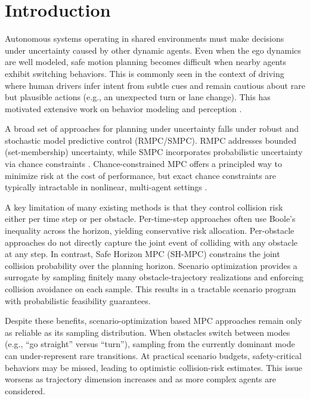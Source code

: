 \documentclass[letterpaper,10pt,conference]{ieeeconf}
\begin{document}

\section{Introduction}

Autonomous systems operating in shared environments must make decisions under uncertainty caused by other dynamic agents.
Even when the ego dynamics are well modeled, safe motion planning becomes difficult when nearby agents exhibit switching behaviors.
This is commonly seen in the context of driving where human drivers infer intent from subtle cues and remain cautious about rare but plausible actions (e.g., an unexpected turn or lane change). This has motivated extensive work on behavior modeling and perception \cite{Ha2013pedestrianBehavior,He1995socialForce,Zi2015youngOldCrossing,Hu2017bikeSocial,Hu2017bikeBehavior}.

A broad set of approaches for planning under uncertainty falls under robust and stochastic model predictive control (RMPC/SMPC).
RMPC addresses bounded (set-membership) uncertainty, while SMPC incorporates probabilistic uncertainty via chance constraints \cite{Mesbah2016SMPCOverview}.
Chance-constrained MPC offers a principled way to minimize risk at the cost of performance, but exact chance constraints are typically intractable in nonlinear, multi-agent settings \cite{Ch1959CCP,schwarm1999chance}.

A key limitation of many existing methods is that they control collision risk either per time step or per obstacle.
Per-time-step approaches often use Boole's inequality across the horizon, yielding conservative risk allocation.
Per-obstacle approaches do not directly capture the joint event of colliding with any obstacle at any step.
In contrast, Safe Horizon MPC (SH-MPC) \cite{degroot2023SBMotionBounded} constrains the joint collision probability over the planning horizon.
Scenario optimization \cite{Cal2006ScenarioApproach,Ca2018ScenarioTheory} provides a surrogate by sampling finitely many obstacle-trajectory realizations and enforcing collision avoidance on each sample. This results in a tractable scenario program with probabilistic feasibility guarantees.

Despite these benefits, scenario-optimization based MPC approaches remain only as reliable as its sampling distribution.
When obstacles switch between modes (e.g., ``go straight'' versus ``turn''), sampling from the currently dominant mode can under-represent rare transitions.
At practical scenario budgets, safety-critical behaviors may be missed, leading to optimistic collision-risk estimates.
This issue worsens as trajectory dimension increases and as more complex agents are considered.
\end{document}
